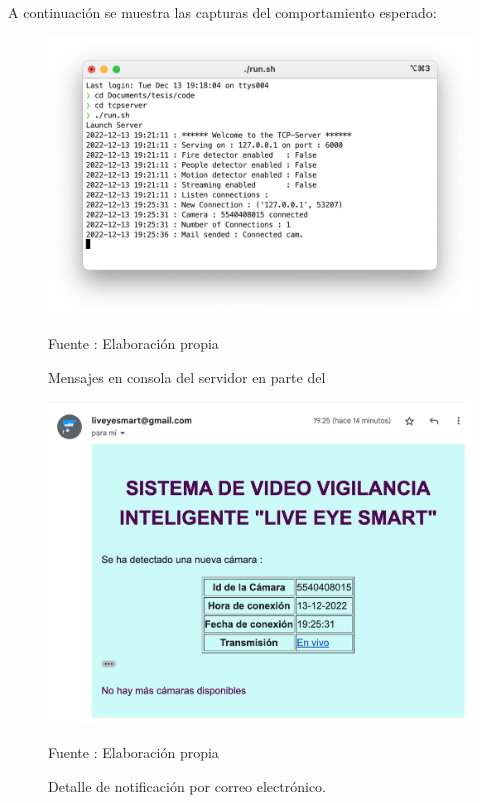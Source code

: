 A continuación se muestra las capturas del comportamiento esperado:\\

\begin{figure}[H]
    \begin{center}
        \includegraphics[width=13cm]{img/capitulo_6/server_cam_connected.png}
        \caption{Mensajes en consola del servidor en parte del}
        Fuente : Elaboración propia
    \end{center}
\end{figure}

\begin{figure}[H]
    \begin{center}
        \includegraphics[width=13cm]{img/capitulo_6/mail1.png}
        \caption{Detalle de notificación por correo electrónico.}
        Fuente : Elaboración propia
    \end{center}
\end{figure}

